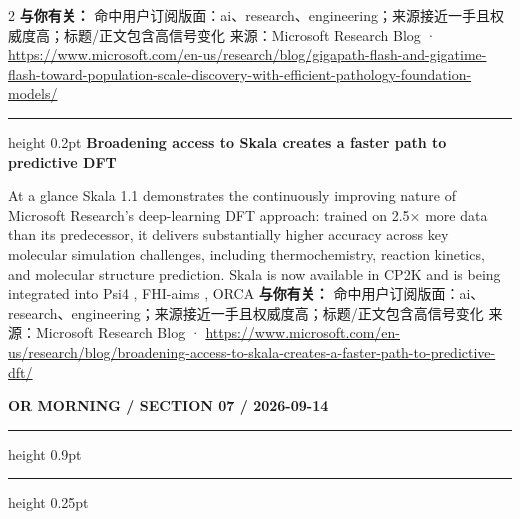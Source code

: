 \documentclass[10.5pt]{ctexart}
\begin{document}
\begin{multicols}{2}
\textbf{与你有关：} 命中用户订阅版面：ai、research、engineering；来源接近一手且权威度高；标题/正文包含高信号变化
{\footnotesize\color{ormuted} 来源：Microsoft Research Blog · \url{https://www.microsoft.com/en-us/research/blog/gigapath-flash-and-gigatime-flash-toward-population-scale-discovery-with-efficient-pathology-foundation-models/}}
\vspace{2mm}
\hrule height 0.2pt
\vspace{2mm}
{\large\bfseries Broadening access to Skala creates a faster path to predictive DFT}\par
At a glance Skala 1.1 demonstrates the continuously improving nature of Microsoft Research’s deep-learning DFT approach: trained on 2.5× more data than its predecessor, it delivers substantially higher accuracy across key molecular simulation challenges, including thermochemistry, reaction kinetics, and molecular structure prediction. Skala is now available in CP2K and is being integrated into Psi4 , FHI-aims , ORCA 
\textbf{与你有关：} 命中用户订阅版面：ai、research、engineering；来源接近一手且权威度高；标题/正文包含高信号变化
{\footnotesize\color{ormuted} 来源：Microsoft Research Blog · \url{https://www.microsoft.com/en-us/research/blog/broadening-access-to-skala-creates-a-faster-path-to-predictive-dft/}}
\end{multicols}
\newpage
{\small\bfseries OR MORNING / SECTION 07 / 2026-09-14}
\vspace{2mm}
\hrule height 0.9pt
\vspace{1.5mm}
\hrule height 0.25pt
\vspace{4mm}
\end{document}
